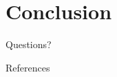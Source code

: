 \documentclass[11pt]{beamer}
\begin{document}



\section{Conclusion}

\begin{frame}
  Questions?
\end{frame}

\appendix

\begin{frame}[allowframebreaks]{References}
    \printbibliography
\end{frame}
\end{document}
